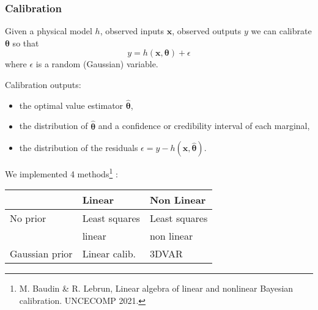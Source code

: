 \documentclass{beamer}
\begin{document}
\begin{frame}
\frametitle{Calibration}

Given a physical model $h$, observed inputs $\boldsymbol{x}$, 
observed outputs $y$ we can calibrate $\boldsymbol{\theta}$ so that 
$$
y = h(\boldsymbol{x}, \boldsymbol{\theta}) + \epsilon
$$
where $\epsilon$ is a random (Gaussian) variable.

Calibration outputs:
\begin{itemize}
\item the optimal value estimator $\hat{\boldsymbol{\theta}}$,
\item the distribution of $\hat{\boldsymbol{\theta}}$ and a confidence or credibility 
interval of each marginal,
\item the distribution of the residuals $\epsilon = y - h(\boldsymbol{x}, \hat{\boldsymbol{\theta}})$.
\end{itemize}

We implemented 4 methods\footnote{M. Baudin \& R. Lebrun, Linear algebra of linear and nonlinear Bayesian calibration. UNCECOMP 2021.} :

\begin{center}
\begin{tabular}{lll}
                     & {\bf Linear} & {\bf Non Linear} \\
\hline
No prior             & Least squares & Least squares \\
                     & linear        &  non linear \\
\hline
Gaussian prior       & Linear calib. & 3DVAR \\
\hline
\end{tabular}
\end{center}

\end{frame}


\end{document}

